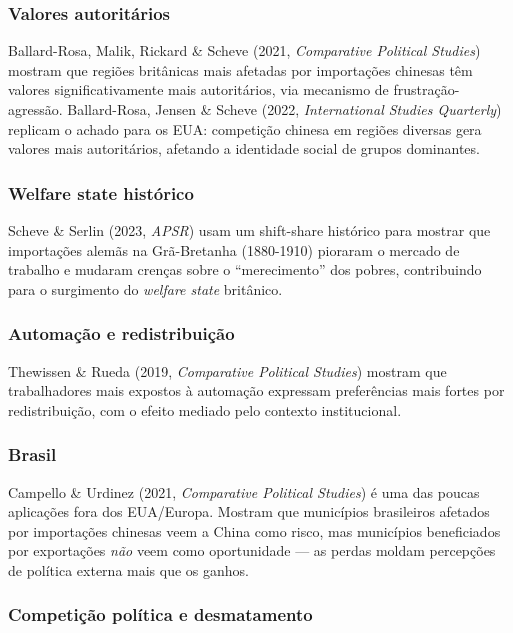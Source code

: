 \documentclass[
]{article}
\begin{document}
\subsubsection{Valores autoritários}\label{valores-autorituxe1rios}

Ballard-Rosa, Malik, Rickard \& Scheve (2021, \emph{Comparative Political Studies}) mostram que regiões britânicas mais afetadas por importações chinesas têm valores significativamente mais autoritários, via mecanismo de frustração-agressão. Ballard-Rosa, Jensen \& Scheve (2022, \emph{International Studies Quarterly}) replicam o achado para os EUA: competição chinesa em regiões diversas gera valores mais autoritários, afetando a identidade social de grupos dominantes.

\subsubsection{Welfare state histórico}\label{welfare-state-histuxf3rico}

Scheve \& Serlin (2023, \emph{APSR}) usam um shift-share histórico para mostrar que importações alemãs na Grã-Bretanha (1880-1910) pioraram o mercado de trabalho e mudaram crenças sobre o ``merecimento'' dos pobres, contribuindo para o surgimento do \emph{welfare state} britânico.

\subsubsection{Automação e redistribuição}\label{automauxe7uxe3o-e-redistribuiuxe7uxe3o}

Thewissen \& Rueda (2019, \emph{Comparative Political Studies}) mostram que trabalhadores mais expostos à automação expressam preferências mais fortes por redistribuição, com o efeito mediado pelo contexto institucional.

\subsubsection{Brasil}\label{brasil}

Campello \& Urdinez (2021, \emph{Comparative Political Studies}) é uma das poucas aplicações fora dos EUA/Europa. Mostram que municípios brasileiros afetados por importações chinesas veem a China como risco, mas municípios beneficiados por exportações \emph{não} veem como oportunidade --- as perdas moldam percepções de política externa mais que os ganhos.

\subsubsection{Competição política e desmatamento}\label{competiuxe7uxe3o-poluxedtica-e-desmatamento}
\end{document}
